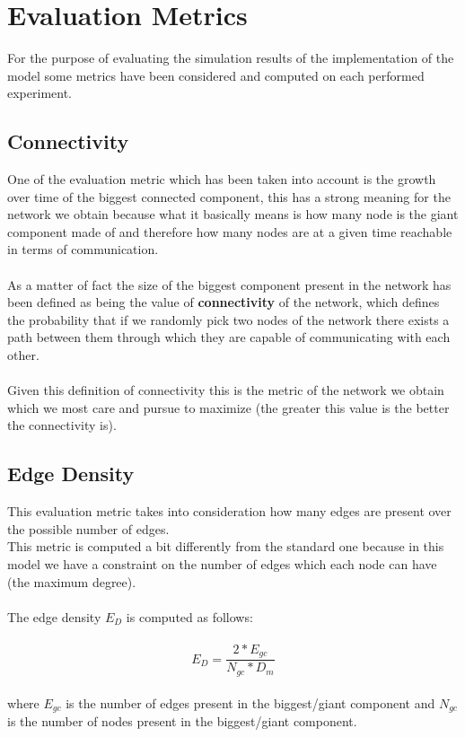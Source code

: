 \documentclass{llncs}
\begin{document}
\section{Evaluation Metrics}
For the purpose of evaluating the simulation results of the implementation of the model some metrics have been considered and computed on each performed experiment.\\
%
\subsection{Connectivity}
One of the evaluation metric which has been taken into account is the growth over time of the biggest connected component, this has a strong meaning for the network we obtain because what it basically means is how many node is the giant component made of and therefore how many nodes are at a given time reachable in terms of communication.\\\\
%
As a matter of fact the size of the biggest component present in the network has been defined as being the value of \textbf{connectivity} of the network, which defines the probability that if we randomly pick two nodes of the network there exists a path between them through which they are capable of communicating with each other.\\\\
%
Given this definition of connectivity this is the metric of the network we obtain which we most care and pursue to maximize (the greater this value is the better the connectivity is).
\subsection{Edge Density}
This evaluation metric takes into consideration how many edges are present over the possible number of edges.\\
This metric is computed a bit differently from the standard one because in this model we have a constraint on the number of edges which each node can have (the maximum degree).\\\\
%
The edge density $E_{D}$ is computed as follows:\\\\
%
\[ E_{D} = \frac{2 * E_{gc} }{ N_{gc} * D_{m} }  \]
\\
where $E_{gc}$ is the number of edges present in the biggest/giant component and $N_{gc}$ is the number of nodes present in the biggest/giant component.
\end{document}
